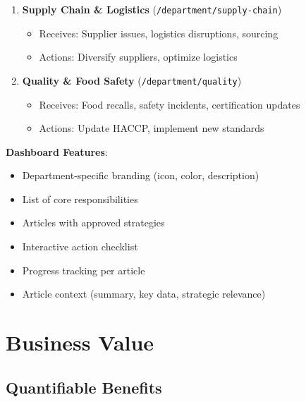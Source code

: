 \documentclass[11pt,a4paper]{article}
\begin{document}
\begin{enumerate}[leftmargin=*]
    \item \textbf{Supply Chain \& Logistics} (\texttt{/department/supply-chain})
    \begin{itemize}
        \item Receives: Supplier issues, logistics disruptions, sourcing
        \item Actions: Diversify suppliers, optimize logistics
    \end{itemize}
    
    \item \textbf{Quality \& Food Safety} (\texttt{/department/quality})
    \begin{itemize}
        \item Receives: Food recalls, safety incidents, certification updates
        \item Actions: Update HACCP, implement new standards
    \end{itemize}
\end{enumerate}

\textbf{Dashboard Features}:
\begin{itemize}[leftmargin=*]
    \item Department-specific branding (icon, color, description)
    \item List of core responsibilities
    \item Articles with approved strategies
    \item Interactive action checklist
    \item Progress tracking per article
    \item Article context (summary, key data, strategic relevance)
\end{itemize}

\section{Business Value}

\subsection{Quantifiable Benefits}
\end{document}
